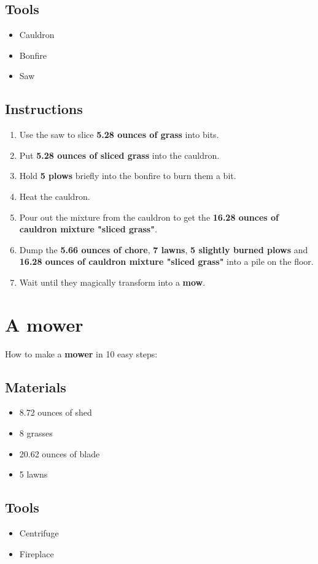 \documentclass{article}
\begin{document}
\subsection{Tools}\begin{itemize}
\item 
Cauldron
\item 
Bonfire
\item 
Saw
\end{itemize}
\subsection{Instructions}\begin{enumerate}
\item 
Use the saw to slice \textbf{5.28 ounces of grass} into bits.
\item 
Put \textbf{5.28 ounces of sliced grass} into the cauldron.
\item 
Hold \textbf{5 plows} briefly into the bonfire to burn them a bit.
\item 
Heat the cauldron.
\item 
Pour out the mixture from the cauldron to get the \textbf{16.28 ounces of cauldron mixture "sliced grass"}.
\item 
Dump the \textbf{5.66 ounces of chore}, \textbf{7 lawns}, \textbf{5 slightly burned plows} and \textbf{16.28 ounces of cauldron mixture "sliced grass"} into a pile on the floor.
\item 
Wait until they magically transform into a \textbf{mow}.
\end{enumerate}
\newpage
\section{A mower}How to make a \textbf{mower} in 10 easy steps:

\subsection{Materials}\begin{itemize}
\item 
8.72 ounces of shed
\item 
8 grasses
\item 
20.62 ounces of blade
\item 
5 lawns
\end{itemize}
\subsection{Tools}\begin{itemize}
\item 
Centrifuge
\item 
Fireplace
\end{itemize}
\end{document}
